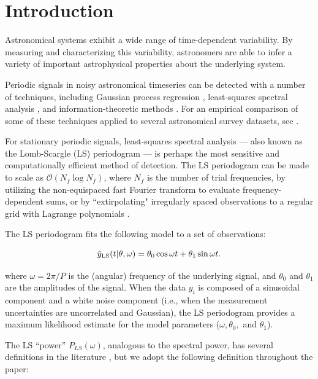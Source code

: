 \documentclass{aastex62}
\newcommand{\bigO}{\mathcal{O}}
\begin{document}
\section{Introduction}\label{sec:introduction}

Astronomical systems exhibit a wide range of time-dependent variability. By measuring and
characterizing this variability, astronomers are able to infer a variety of important
astrophysical properties about the underlying system.

Periodic signals in noisy astronomical timeseries can be detected with a number of techniques,
including Gaussian process regression \citep{Foreman-Mackey_etal_2017,Rasmussen+Williams_2006},
least-squares spectral analysis \citep{Lomb_1976,Scargle_1982,Barning_1963,Vanicek_1971}, and
information-theoretic methods \citep{Graham_etal_2013b,Huijse_etal_2012,Cincotta_etal_1995}. For an empirical
comparison of some of these techniques applied to several astronomical survey datasets, see
\cite{Graham_etal_2013}.

For stationary periodic signals, least-squares spectral analysis --- also known as
the Lomb-Scargle (LS) periodogram \citep{Lomb_1976,Scargle_1982,Barning_1963,Vanicek_1971} ---
is perhaps the most sensitive and computationally efficient method of detection. The LS periodogram
can be made to scale as $\bigO(N_f\log N_f)$, where $N_f$ is the number of trial frequencies, by
utilizing the non-equispaced fast Fourier transform \citep[][NFFT]{NFFT_KKD2009,NFFT_DR1993} to evaluate frequency-dependent
sums, or by ``extirpolating" irregularly spaced observations to a regular grid with Lagrange polynomials \citep{Press+Rybicki_1989}.

The LS periodogram fits the following model to a set of observations:

\begin{equation}
    \hat{y}_{\rm LS}(t|\theta, \omega) = \theta_0\cos{\omega t} + \theta_1\sin{\omega t}.
\end{equation}

where $\omega = 2\pi / P$ is the (angular) frequency of the underlying signal, and $\theta_0$ and
$\theta_1$ are the amplitudes of the signal. When the data $y_i$ is composed of a sinusoidal
component and a white noise component (i.e., when the measurement uncertainties are uncorrelated and
Gaussian), the LS periodogram provides a maximum likelihood estimate for the model parameters ($\omega, \theta_0,$ and
$\theta_1$).

The LS ``power'' $P_{LS}(\omega)$, analogous to the spectral power, has several definitions
in the literature \citep{Zechmeister+Kurster_2009}, but we adopt the following definition throughout the paper:
\end{document}
